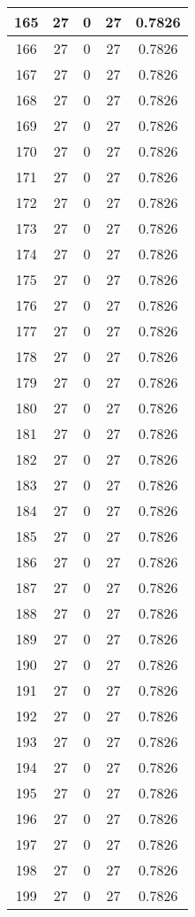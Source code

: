\documentclass[letterpaper, 12pt]{article}
\begin{document}
\begin{longtable}{|c|c|c|c|c|}
\hline
165 & 27 & 0 & 27 & 0.7826 \\
\hline
166 & 27 & 0 & 27 & 0.7826 \\
\hline
167 & 27 & 0 & 27 & 0.7826 \\
\hline
168 & 27 & 0 & 27 & 0.7826 \\
\hline
169 & 27 & 0 & 27 & 0.7826 \\
\hline
170 & 27 & 0 & 27 & 0.7826 \\
\hline
171 & 27 & 0 & 27 & 0.7826 \\
\hline
172 & 27 & 0 & 27 & 0.7826 \\
\hline
173 & 27 & 0 & 27 & 0.7826 \\
\hline
174 & 27 & 0 & 27 & 0.7826 \\
\hline
175 & 27 & 0 & 27 & 0.7826 \\
\hline
176 & 27 & 0 & 27 & 0.7826 \\
\hline
177 & 27 & 0 & 27 & 0.7826 \\
\hline
178 & 27 & 0 & 27 & 0.7826 \\
\hline
179 & 27 & 0 & 27 & 0.7826 \\
\hline
180 & 27 & 0 & 27 & 0.7826 \\
\hline
181 & 27 & 0 & 27 & 0.7826 \\
\hline
182 & 27 & 0 & 27 & 0.7826 \\
\hline
183 & 27 & 0 & 27 & 0.7826 \\
\hline
184 & 27 & 0 & 27 & 0.7826 \\
\hline
185 & 27 & 0 & 27 & 0.7826 \\
\hline
186 & 27 & 0 & 27 & 0.7826 \\
\hline
187 & 27 & 0 & 27 & 0.7826 \\
\hline
188 & 27 & 0 & 27 & 0.7826 \\
\hline
189 & 27 & 0 & 27 & 0.7826 \\
\hline
190 & 27 & 0 & 27 & 0.7826 \\
\hline
191 & 27 & 0 & 27 & 0.7826 \\
\hline
192 & 27 & 0 & 27 & 0.7826 \\
\hline
193 & 27 & 0 & 27 & 0.7826 \\
\hline
194 & 27 & 0 & 27 & 0.7826 \\
\hline
195 & 27 & 0 & 27 & 0.7826 \\
\hline
196 & 27 & 0 & 27 & 0.7826 \\
\hline
197 & 27 & 0 & 27 & 0.7826 \\
\hline
198 & 27 & 0 & 27 & 0.7826 \\
\hline
199 & 27 & 0 & 27 & 0.7826 \\
\hline
\end{longtable}
\end{document}
